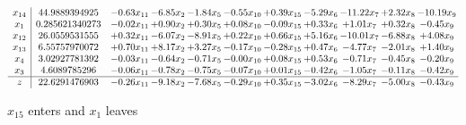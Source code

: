 \documentclass[9pt]{article}
\begin{document}
 \[\begin{array}{c| c c@{\hskip 2pt} c@{\hskip 2pt} c@{\hskip 2pt} c@{\hskip 2pt} c@{\hskip 2pt} c@{\hskip 2pt} c@{\hskip 2pt} c@{\hskip 2pt} c@{\hskip 2pt} }
 x_{14}   &  44.9889394925 & -0.63 x_{11} & -6.85 x_{2} & -1.84 x_{5} & -0.55 x_{10} & +  0.39 x_{15} & -5.29 x_{6} & -11.22 x_{7} & +  2.32 x_{8} & -10.19 x_{9}\\
 x_{1}   &  0.285621340273 & -0.02 x_{11} & +  0.90 x_{2} & +  0.30 x_{5} & +  0.08 x_{10} & -0.09 x_{15} & +  0.33 x_{6} & +  1.01 x_{7} & +  0.32 x_{8} & -0.45 x_{9}\\
 x_{12}   &  26.0559531555 & +  0.32 x_{11} & -6.07 x_{2} & -8.91 x_{5} & +  0.22 x_{10} & +  0.66 x_{15} & +  5.16 x_{6} & -10.01 x_{7} & -6.88 x_{8} & +  4.08 x_{9}\\
 x_{13}   &  6.55757970072 & +  0.70 x_{11} & +  8.17 x_{2} & +  3.27 x_{5} & -0.17 x_{10} & -0.28 x_{15} & +  0.47 x_{6} & -4.77 x_{7} & -2.01 x_{8} & +  1.40 x_{9}\\
 x_{4}   &  3.02927781392 & -0.03 x_{11} & -0.64 x_{2} & -0.71 x_{5} & -0.00 x_{10} & +  0.08 x_{15} & +  0.53 x_{6} & -0.71 x_{7} & -0.45 x_{8} & -0.20 x_{9}\\
 x_{3}   &  4.6089785296 & -0.06 x_{11} & -0.78 x_{2} & -0.75 x_{5} & -0.07 x_{10} & +  0.01 x_{15} & -0.42 x_{6} & -1.05 x_{7} & -0.11 x_{8} & -0.42 x_{9}\\
\hline
z    &  22.6291476903 & -0.26 x_{11} & -9.18 x_{2} & -7.68 x_{5} & -0.29 x_{10} & +  0.35 x_{15} & -3.02 x_{6} & -8.29 x_{7} & -5.00 x_{8} & -0.43 x_{9}\\
\end{array}\]


 $ x_{15} $ enters and $ x_{1} $ leaves 
\end{document}
